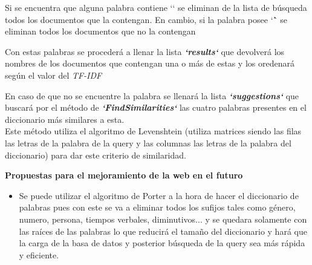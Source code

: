 \documentclass{beamer}
\begin{document}
\begin{frame}
 \begin{flushleft}
\large{Si se encuentra que alguna palabra contiene `\textexclamdown` se eliminan de la lista de búsqueda todos los documentos que la contengan. En cambio, si la palabra posee `\^` se eliminan todos los documentos que no la contengan}
\end{flushleft}
\end{frame}

\begin{frame}
 \begin{flushleft}
\large{Con estas palabras se procederá a llenar la lista \textbf{\textit{`results`}}  que devolverá los nombres de los documentos que contengan una o más de estas y los oredenará según  el valor del \textit{ TF-IDF}}
\end{flushleft}
\end{frame}

\begin{frame}
 \begin{flushleft}
\large{En caso de que no se encuentre la palabra se llenará la lista \textbf{\textit{`suggestions`}} que buscará
por el método de \textbf{\textit{`FindSimilarities`}} las cuatro palabras presentes en el diccionario más similares a esta.\linebreak \\
 Este método utiliza el algoritmo de 
Levenshtein (utiliza matrices siendo las filas las letras de la palabra de la query y las 
columnas las letras de la palabra del diccionario) para dar este criterio de similaridad.}
\end{flushleft}
\end{frame}

\begin{frame}
 \begin{flushleft}
\Large {\textbf{ Propuestas para el mejoramiento de la web en el futuro}}\linebreak \\
\begin{itemize}
\item\large{ Se puede utilizar el algoritmo de Porter a la hora de hacer el diccionario de palabras 
pues con este se va a eliminar todos los sufijos tales como género, numero, persona, 
tiempos verbales, diminutivos... y se quedara solamente con las raíces de las palabras 
lo que reducirá el tamaño del diccionario y hará que la carga de la basa de datos y 
posterior búsqueda de la query sea más rápida y eficiente.}
\end{itemize}
\end{flushleft}
\end{frame}
\end{document}
